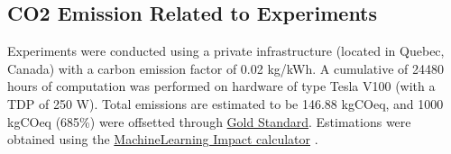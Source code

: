 \documentclass[runningheads]{llncs}
\begin{document}
\subsection*{CO2 Emission Related to Experiments}

Experiments were conducted using a private infrastructure (located in Quebec, Canada) with a carbon emission factor of 0.02 kg/kWh. A cumulative of 24480 hours of computation was performed on hardware of type Tesla V100 (with a TDP of 250 W). Total emissions are estimated to be 146.88 kgCOeq, and 1000 kgCOeq (685\%) were offsetted through \href{https://www.goldstandard.org/take-action/offset-your-emissions}{Gold Standard}. Estimations were obtained using the \href{https://mlco2.github.io/impact#compute}{MachineLearning Impact calculator} \cite{lacoste2019quantifying}.
\end{document}
